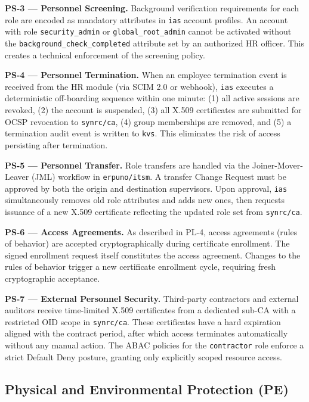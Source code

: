 \documentclass{article}
\begin{document}
\textbf{PS-3 --- Personnel Screening.}
Background verification requirements for each role are encoded as mandatory attributes in \texttt{ias} account profiles. An account with role \texttt{security\_admin} or \texttt{global\_root\_admin} cannot be activated without the \texttt{background\_check\_completed} attribute set by an authorized HR officer. This creates a technical enforcement of the screening policy.

\textbf{PS-4 --- Personnel Termination.}
When an employee termination event is received from the HR module (via SCIM 2.0 or webhook), \texttt{ias} executes a deterministic off-boarding sequence within one minute: (1) all active sessions are revoked, (2) the account is suspended, (3) all X.509 certificates are submitted for OCSP revocation to \texttt{synrc/ca}, (4) group memberships are removed, and (5) a termination audit event is written to \texttt{kvs}. This eliminates the risk of access persisting after termination.

\textbf{PS-5 --- Personnel Transfer.}
Role transfers are handled via the Joiner-Mover-Leaver (JML) workflow in \texttt{erpuno/itsm}. A transfer Change Request must be approved by both the origin and destination supervisors. Upon approval, \texttt{ias} simultaneously removes old role attributes and adds new ones, then requests issuance of a new X.509 certificate reflecting the updated role set from \texttt{synrc/ca}.

\textbf{PS-6 --- Access Agreements.}
As described in PL-4, access agreements (rules of behavior) are accepted cryptographically during certificate enrollment. The signed enrollment request itself constitutes the access agreement. Changes to the rules of behavior trigger a new certificate enrollment cycle, requiring fresh cryptographic acceptance.

\textbf{PS-7 --- External Personnel Security.}
Third-party contractors and external auditors receive time-limited X.509 certificates from a dedicated sub-CA with a restricted OID scope in \texttt{synrc/ca}. These certificates have a hard expiration aligned with the contract period, after which access terminates automatically without any manual action. The ABAC policies for the \texttt{contractor} role enforce a strict Default Deny posture, granting only explicitly scoped resource access.

\subsection{Physical and Environmental Protection (PE)}
\end{document}
